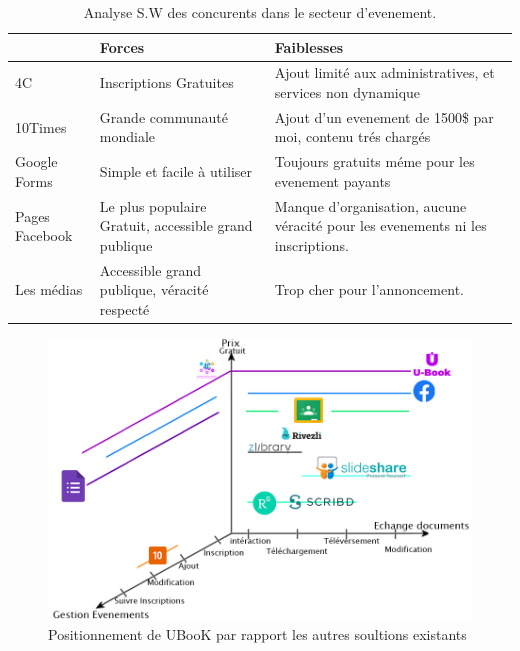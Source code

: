 \documentclass[12pt]{report}
\begin{document}
\begin{table}[h!]
\begin{center}
\begin{tabular}{ | m{3cm} | m{6cm}| m{6cm} |} 
 \hline
   & Forces & Faiblesses \\ 
 \hline
 4C\cite{63} & Inscriptions Gratuites & Ajout limité aux administratives, et services non dynamique \\ 
 \hline
 10Times \cite{65} & Grande communauté mondiale & Ajout d'un evenement de 1500\$ par moi, contenu trés chargés \\ 
  \hline
 Google Forms \cite{64} & Simple et facile à utiliser & Toujours gratuits méme pour  les evenement payants\\ 
 \hline
 Pages Facebook \cite{66}& Le plus populaire Gratuit, accessible grand publique & Manque d’organisation, aucune véracité pour les evenements ni les inscriptions. \\ 
 \hline
 Les médias & Accessible grand publique, véracité respecté & Trop cher pour l'annoncement.\\
 \hline
\end{tabular}
\caption{Analyse S.W des concurents dans le secteur d'evenement.}
\label{table:eventanalyse}
\end{center}
\end{table}
\begin{figure}[!h]
    \centering
    \includegraphics[width=1\textwidth]{concurence}
    \caption{Positionnement de UBooK par rapport les autres soultions existants }
    \label{.:.}
\end{figure}

\newpage
\end{document}
